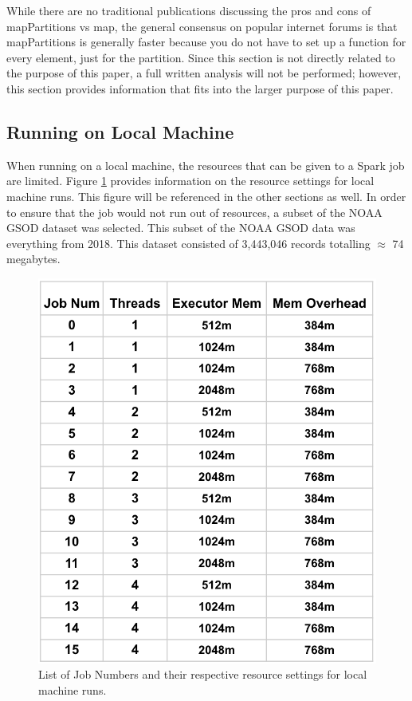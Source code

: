 \documentclass[conference]{IEEEtran}
\begin{document}
While there are no traditional publications discussing the pros and cons of mapPartitions vs map, the general consensus on popular internet forums is that mapPartitions is generally faster because you do not have to set up a function for every element, just for the partition. \cite{b4,b5,b6}
Since this section is not directly related to the purpose of this paper, a full written analysis will not be performed; however, this section provides information that fits into the larger purpose of this paper.

\subsection{Running on Local Machine}

When running on a local machine, the resources that can be given to a Spark job are limited.
Figure \ref{fig:localjobs} provides information on the resource settings for local machine runs.
This figure will be referenced in the other sections as well.
In order to ensure that the job would not run out of resources, a subset of the NOAA GSOD dataset was selected.
This subset of the NOAA GSOD data was everything from 2018.
This dataset consisted of 3,443,046 records totalling $\approx$ 74 megabytes.

\begin{figure}
    \includegraphics[width=\linewidth]{presentation_table.PNG}
    \caption{List of Job Numbers and their respective resource settings for local machine runs.}
    \label{fig:localjobs}
\end{figure}
\end{document}

